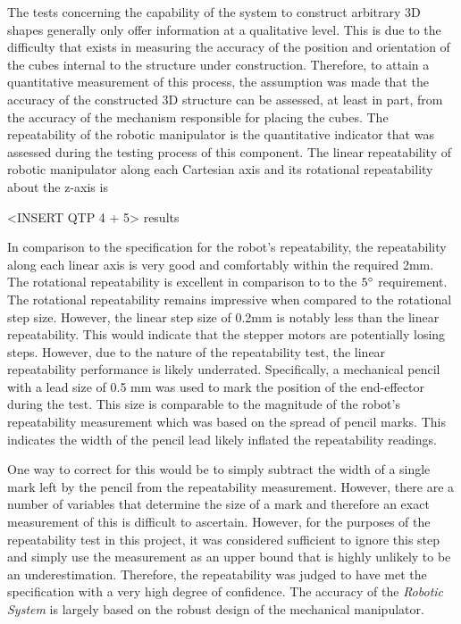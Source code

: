 The tests concerning the capability of the system to construct arbitrary 3D shapes generally only offer information at a qualitative level. This is due to the difficulty that exists in measuring the accuracy of the position and orientation of the cubes internal to the structure under construction. Therefore, to attain a quantitative measurement of this process, the assumption was made that the accuracy of the constructed 3D structure can be assessed, at least in part, from the accuracy of the mechanism responsible for placing the cubes. The repeatability of the robotic manipulator is the quantitative indicator that was assessed during the testing process of this component. The linear repeatability of robotic manipulator along each Cartesian axis and its rotational repeatability about the z-axis is

<INSERT QTP 4 + 5> results

In comparison to the specification for the robot's repeatability, the repeatability along each linear axis is very good and comfortably within the required 2mm. The rotational repeatability is excellent in comparison to to the $5^{\circ}$ requirement. The rotational repeatability remains impressive when compared to the rotational step size. However, the linear step size of 0.2mm is notably less than the linear repeatability. This would indicate that the stepper motors are potentially losing steps. However, due to the nature of the repeatability test, the linear repeatability performance is likely underrated. Specifically, a mechanical pencil with a lead size of 0.5 mm was used to mark the position of the end-effector during the test. This size is comparable to the magnitude of the robot's repeatability measurement which was based on the spread of pencil marks. This indicates the width of the pencil lead likely inflated the repeatability readings. 

One way to correct for this would be to simply subtract the width of a single mark left by the pencil from the repeatability measurement. However, there are a number of variables that determine the size of a mark and therefore an exact measurement of this is difficult to ascertain. However, for the purposes of the repeatability test in this project, it was considered sufficient to ignore this step and simply use the measurement as an upper bound that is highly unlikely to be an underestimation. Therefore, the repeatability was judged to have met the specification with a very high degree of confidence. The accuracy of the \textit{Robotic System} is largely based on the robust design of the mechanical manipulator.

